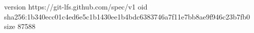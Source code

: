 version https://git-lfs.github.com/spec/v1
oid sha256:1b340ecc01c4ed6e5c1b1430ee1b4bdc6383746a7f11e7bb8ae9f946c23b7fb0
size 87588
